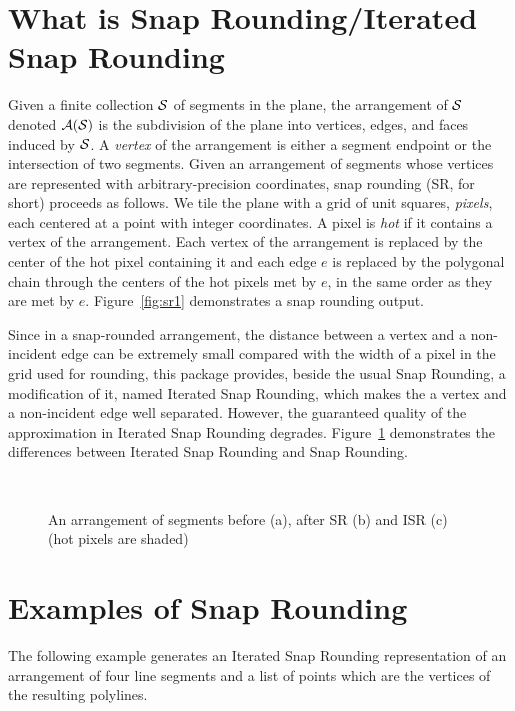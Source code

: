 \section{What is Snap Rounding/Iterated Snap Rounding}
Given a finite collection $\S$ of segments in the plane, the
arrangement of $\S$ denoted $\A(\S)$ is the subdivision of the plane
into vertices, edges, and faces induced by $\S$. %
A {\it vertex\/} of the arrangement is either a segment endpoint or
the intersection of two segments. Given an arrangement of segments
whose vertices are represented with arbitrary-precision coordinates,
snap rounding (SR, for short) proceeds as follows.  We tile the plane
with a grid of unit squares, {\it pixels}, each centered at a point
with integer coordinates. A pixel is {\it hot\/} if it contains a
vertex of the arrangement. Each vertex of the arrangement is replaced
by the center of the hot pixel containing it and each edge $e$ is
replaced by the polygonal chain through the centers of the hot pixels
met by $e$, in the same order as they are met by $e$. 
Figure~\ref{fig:sr1} demonstrates a snap rounding output. 

Since in a snap-rounded arrangement, the distance between a vertex and
a non-incident edge can be extremely small compared with the width of a
pixel in the grid used for rounding, this package provides, beside the
usual Snap Rounding, a modification of it, named Iterated Snap Rounding,
which makes the a vertex and a non-incident edge well separated. However,
the guaranteed quality of the approximation in Iterated Snap Rounding
degrades. 
Figure~\ref{fig:isr_vs_sr} demonstrates the differences between Iterated
Snap Rounding and Snap Rounding.

\begin{figure}
\begin{center}
\  \
\end{center}
\vspace{-2ex}
\caption{An arrangement of segments before (a), after SR (b)
and ISR (c) (hot pixels are shaded)}
\label{fig:isr_vs_sr}
\end{figure}

\section{Examples of Snap Rounding}

The following example generates an Iterated Snap Rounding representation
of an arrangement of four line segments
and a list of points which are the vertices of the resulting polylines.




